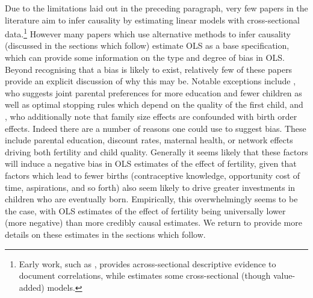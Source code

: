 Due to the limitations laid out in the preceding paragraph, very few papers in 
the literature aim to infer causality by estimating linear models with 
cross-sectional data.\footnote{Early work, such as \citet{Desai1995}, provides 
across-sectional descriptive 
evidence to document correlations, while \citet{Hanushek1992} estimates some
cross-sectional (though value-added) models.}  However many papers which use 
alternative methods to infer causality (discussed in the sections which follow)
estimate OLS as a base specification, which can provide some information on the 
type and degree of bias in OLS.  Beyond recognising that a bias is likely to 
exist, relatively few of these papers provide an explicit discussion of why this
may be.  Notable exceptions include \citet{Qian2009}, who suggests joint
parental preferences for more education and fewer children as well as optimal
stopping rules which depend on the quality of the first child, and 
\citet{Blacketal2010}, who additionally note that family size effects are 
confounded with birth order effects.  Indeed there are a number of reasons one
could use to suggest bias.  These include parental education, discount rates,
maternal health, or network effects driving both fertility and child quality.  
Generally it seems likely that these factors will induce a negative bias in OLS
estimates of the effect of fertility, given that 
factors which lead to fewer births (contraceptive knowledge, opportunity cost of
time, aspirations, and so forth) also seem likely to drive greater investments 
in children who are eventually born.  Empirically, this overwhelmingly seems to
be the case, with OLS estimates of the effect of fertility being universally 
lower (more negative) than more credibly causal estimates.  We return to provide
more details on these estimates in the sections which follow.

